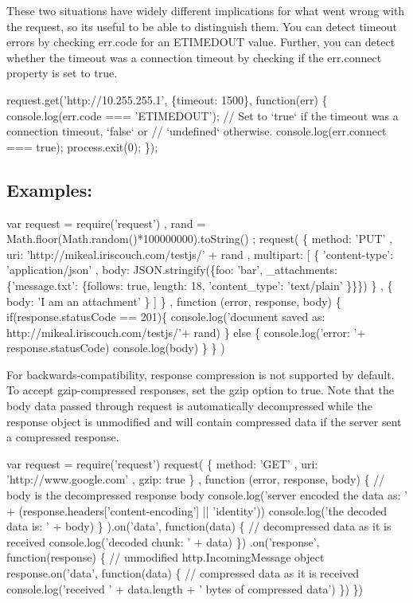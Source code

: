 These two situations have widely different implications for what went wrong with the request, so it\textquotesingle{}s useful to be able to distinguish them. You can detect timeout errors by checking {\ttfamily err.\+code} for an \textquotesingle{}E\+T\+I\+M\+E\+D\+O\+UT\textquotesingle{} value. Further, you can detect whether the timeout was a connection timeout by checking if the {\ttfamily err.\+connect} property is set to {\ttfamily true}.


\begin{DoxyCode}
request.get('http://10.255.255.1', \{timeout: 1500\}, function(err) \{
    console.log(err.code === 'ETIMEDOUT');
    // Set to `true` if the timeout was a connection timeout, `false` or
    // `undefined` otherwise.
    console.log(err.connect === true);
    process.exit(0);
\});
\end{DoxyCode}


\subsection*{Examples\+:}


\begin{DoxyCode}
var request = require('request')
  , rand = Math.floor(Math.random()*100000000).toString()
  ;
request(
  \{ method: 'PUT'
  , uri: 'http://mikeal.iriscouch.com/testjs/' + rand
  , multipart:
    [ \{ 'content-type': 'application/json'
      ,  body: JSON.stringify(\{foo: 'bar', \_attachments: \{'message.txt': \{follows: true, length: 18,
       'content\_type': 'text/plain' \}\}\})
      \}
    , \{ body: 'I am an attachment' \}
    ]
  \}
, function (error, response, body) \{
    if(response.statusCode == 201)\{
      console.log('document saved as: http://mikeal.iriscouch.com/testjs/'+ rand)
    \} else \{
      console.log('error: '+ response.statusCode)
      console.log(body)
    \}
  \}
)
\end{DoxyCode}


For backwards-\/compatibility, response compression is not supported by default. To accept gzip-\/compressed responses, set the {\ttfamily gzip} option to {\ttfamily true}. Note that the body data passed through {\ttfamily request} is automatically decompressed while the response object is unmodified and will contain compressed data if the server sent a compressed response.


\begin{DoxyCode}
var request = require('request')
request(
  \{ method: 'GET'
  , uri: 'http://www.google.com'
  , gzip: true
  \}
, function (error, response, body) \{
    // body is the decompressed response body
    console.log('server encoded the data as: ' + (response.headers['content-encoding'] || 'identity'))
    console.log('the decoded data is: ' + body)
  \}
).on('data', function(data) \{
  // decompressed data as it is received
  console.log('decoded chunk: ' + data)
\})
.on('response', function(response) \{
  // unmodified http.IncomingMessage object
  response.on('data', function(data) \{
    // compressed data as it is received
    console.log('received ' + data.length + ' bytes of compressed data')
  \})
\})
\end{DoxyCode}


